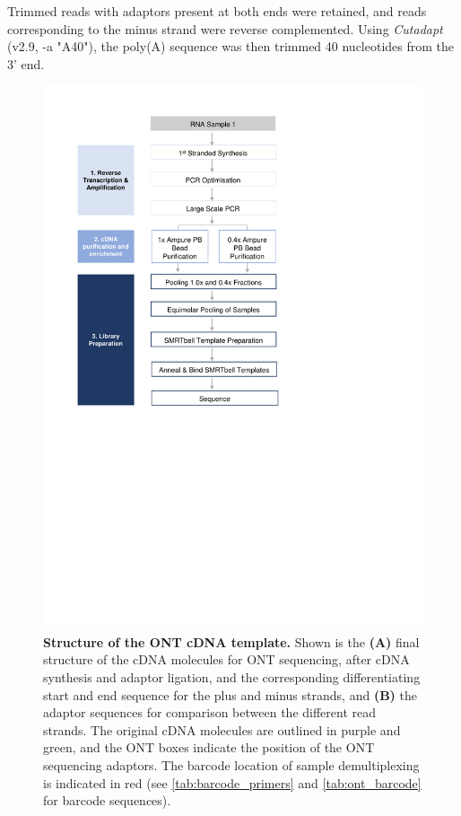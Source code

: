 Trimmed reads with adaptors present at both ends were retained, and reads corresponding to the minus strand were reverse complemented. Using \textit{Cutadapt}\cite{Martin2011} (v2.9, -a "A{40}"), the poly(A) sequence was then trimmed 40 nucleotides from the 3' end.

\begin{figure}[ht]
	\begin{center}
		\includegraphics[page=22,trim={0cm 17cm 0cm 1cm},clip, scale = 0.7]{Figures/ProjectDevelopment_Figures.pdf}
	\end{center}
	\captionsetup{width=0.95\textwidth}
	\caption[Structure of the ONT cDNA template]%
	{\textbf{Structure of the ONT cDNA template.} Shown is the \textbf{(A)} final structure of the cDNA molecules for ONT sequencing, after cDNA synthesis and adaptor ligation, and the corresponding differentiating start and end sequence for the plus and minus strands, and \textbf{(B)} the adaptor sequences for comparison between the different read strands. The original cDNA molecules are outlined in purple and green, and the ONT boxes indicate the position of the ONT sequencing adaptors. The barcode location of sample demultiplexing is indicated in red (see \cref{tab:barcode_primers} and \cref{tab:ont_barcode} for barcode sequences). 
}
\end{figure}
